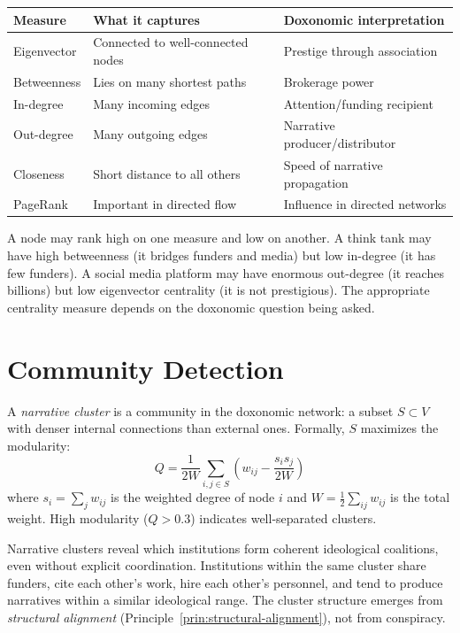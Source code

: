 \begin{center}
\begin{tabular}{lp{5cm}p{5cm}}
\toprule
\textbf{Measure} & \textbf{What it captures} & \textbf{Doxonomic interpretation} \\
\midrule
Eigenvector & Connected to well-connected nodes & Prestige through association \\
Betweenness & Lies on many shortest paths & Brokerage power \\
In-degree & Many incoming edges & Attention/funding recipient \\
Out-degree & Many outgoing edges & Narrative producer/distributor \\
Closeness & Short distance to all others & Speed of narrative propagation \\
PageRank & Important in directed flow & Influence in directed networks \\
\bottomrule
\end{tabular}
\end{center}

A node may rank high on one measure and low on another.
A think tank may have high betweenness (it bridges funders and media) but low in-degree (it has few funders).
A social media platform may have enormous out-degree (it reaches billions) but low eigenvector centrality (it is not prestigious).
The appropriate centrality measure depends on the doxonomic question being asked.


\section{Community Detection}
\label{sec:ch15-community}

\begin{definition}
\label{def:narrative-cluster}
A \emph{narrative cluster} is a community in the doxonomic network: a subset $S \subset V$ with denser internal connections than external ones.
Formally, $S$ maximizes the modularity:
\[
  Q = \frac{1}{2W} \sum_{i,j \in S} \left(w_{ij} - \frac{s_i s_j}{2W}\right)
\]
where $s_i = \sum_j w_{ij}$ is the weighted degree of node $i$ and $W = \frac{1}{2}\sum_{ij} w_{ij}$ is the total weight.
High modularity ($Q > 0.3$) indicates well-separated clusters.
\end{definition}

Narrative clusters reveal which institutions form coherent ideological coalitions, even without explicit coordination.
Institutions within the same cluster share funders, cite each other's work, hire each other's personnel, and tend to produce narratives within a similar ideological range.
The cluster structure emerges from \emph{structural alignment} (Principle~\ref{prin:structural-alignment}), not from conspiracy.

